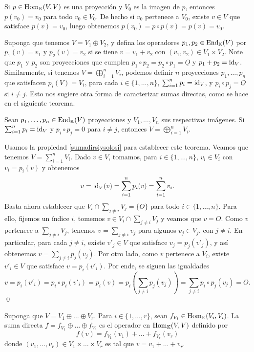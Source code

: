 \begin{obs}
Si $p\in\operatorname{Hom}_\mathbb{K}(V,V)$ es una proyecci\'on y $V_0$ es la imagen de $p$, entonces $p(v_0)=v_0$ para todo $v_0\in V_0$. De hecho si $v_0$ pertenece a $V_0$, existe $v\in V$ que satisface $p(v)=v_0$, luego obtenemos $p(v_0)=p\circ p(v)=p(v)=v_0$.
\end{obs}

\begin{obs}
Suponga que tenemos $V=V_1\oplus V_2$, y defina los operadores $p_1,p_2\in\operatorname{End}_\mathbb{K}(V)$ por $p_1(v)=v_1$ y $p_2(v)=v_2$ si se tiene $v=v_1+v_2$ con $(v_1,v_2)\in V_1\times V_2$. Note que $p_1$ y $p_2$ son proyecciones que cumplen $p_1\circ p_2=p_2\circ p_1=\underline{O}$ y $p_1+p_2=\operatorname{id}_V$. Similarmente, si tenemos $V=\bigoplus_{i=1}^{n}V_i$, podemos definir $n$ proyecciones $p_1,\ldots,p_n$ que satisfacen $p_i(V)=V_i$, para cada $i\in\{1,\ldots,n\}$, $\sum_{i=1}^n p_i=\operatorname{id}_V$, y $p_i\circ p_j=\underline{O}$ si $i\ne j$. Esto nos sugiere otra forma de caracterizar sumas directas, como se hace en el siguiente teorema.
\end{obs}

\begin{teo}\label{proysumadir}
Sean $p_1,\ldots,p_n\in\operatorname{End}_\mathbb{K}(V)$ proyecciones y $V_1,\ldots,V_n$ sus respectivas im\'agenes. Si $\sum_{i=1}^n p_i=\operatorname{id}_V$ y $p_i\circ p_j=0$ para $i\ne j$, entonces $V=\bigoplus_{i=1}^n V_i$.
\end{teo}

\dem Usamos la propiedad \ref{sumadirsiysolosi} para establecer este teorema. Veamos que tenemos $V=\sum_{i=1}^nV_i$. Dado $v\in V$, tomamos, para $i\in\{1,\ldots,n\}$, $v_i\in V_i$ con $v_i=p_i(v)$ y obtenemos
\[
v=\operatorname{id}_V(v)=\sum_{i=1}^n p_i(v)=\sum_{i=1}^n v_i.
\]
Basta ahora establecer que $V_i\cap\sum_{j\ne i} V_j=\{O\}$ para todo $i\in\{1,\ldots,n\}$. Para ello, fijemos un índice $i$, tomemos $v\in V_i\cap\sum_{j\ne i} V_j$ y veamos que $v=O$. Como $v$ pertenece a $\sum_{j\ne i} V_j$, tenemos $v=\sum_{j\ne i} v_j$ para algunos $v_j\in V_j$, con $j\ne i$. En particular, para cada $j\ne i$, existe $v'_j\in V$ que satisface $v_j=p_j(v'_j)$, y as\'i obtenemos $v=\sum_{j\ne i} p_j(v_j)$. Por otro lado, como $v$ pertenece a $V_i$, existe $v'_i\in V$ que satisface $v=p_i(v'_i)$. Por ende, se siguen las igualdades
\[
v=p_i(v'_i)=p_i\circ p_i (v'_i)=p_i(v)=p_i\left(\sum_{j\ne i} p_j(v_j)\right)=\sum_{j\ne i} p_i\circ p_j(v_j)=O.
\]
\qed

\begin{defn}
  Suponga que $V=V_1\oplus\ldots\oplus V_r$. Para $i\in\{1,\ldots,r\}$, sean $f_{V_i}\in\operatorname{Hom}_\mathbb{K}(V_i,V_i)$. La suma directa $f=f_{V_1}\oplus\ldots\oplus f_{V_r}$ es el operador en $\operatorname{Hom}_\mathbb{K}(V,V)$ definido por $$f(v)=f_{V_1}(v_1)+\ldots+f_{V_r}(v_r)$$
  donde $(v_1,\ldots,v_r)\in V_1\times\ldots\times V_r$ es tal que $v=v_1+\ldots+v_r$.
\end{defn}


